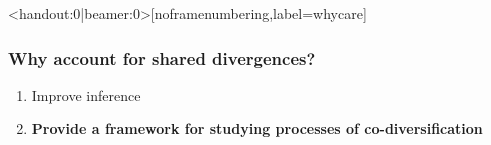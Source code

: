 \begin{frame}<handout:0|beamer:0>[noframenumbering,label=whycare]
    \frametitle{Why account for shared divergences?}

    \begin{enumerate}
        \item<2-> Improve inference
        \vspace{3mm}
        \item<3-> \textbf{Provide a framework for studying processes of
                co-diversification}
    \end{enumerate}

\end{frame}


% 



